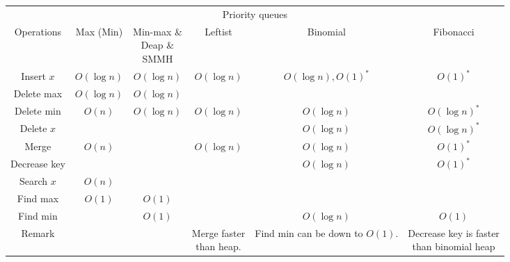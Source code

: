 \begin{table}[H]
    \centering
    \begin{tabular}{|c|c|c|c|c|c|}
        \hline
        \multicolumn{6}{|c|}{Priority queues} \\
        \Xhline{3\arrayrulewidth}
        Operations & Max (Min) & \makecell{Min-max \&\\Deap \&\\SMMH} & Leftist & Binomial & Fibonacci \\
        \Xhline{2\arrayrulewidth}
        Insert $x$ & $O(\log n)$ & $O(\log n)$ & $O(\log n)$ & $O(\log n), O(1)^*$ & $O(1)^*$ \\
        \hline
        Delete max & $O(\log n)$ & $O(\log n)$ & & & \\
        \hline
        Delete min & $O(n)$ & $O(\log n)$ & $O(\log n)$ & $O(\log n)$ & $O(\log n)^*$ \\
        \hline
        Delete $x$ & & & & $O(\log n)$ & $O(\log n)^*$ \\
        \hline
        Merge & $O(n)$ & & $O(\log n)$ & $O(\log n)$ & $O(1)^*$ \\
        \hline
        Decrease key & & & & $O(\log n)$ & $O(1)^*$ \\
        \hline
        Search $x$ & $O(n)$ & & & & \\
        \hline
        Find max & $O(1)$ & $O(1)$ & & & \\
        \hline
        Find min & & $O(1)$ & & $O(\log n)$ & $O(1)$ \\
        \hline
        Remark & & & \makecell{Merge faster\\than heap.} & \makecell{Find min can be\\down to $O(1)$.} & \makecell{Decrease key is faster\\than binomial heap} \\
        \hline
    \end{tabular}
\end{table}


